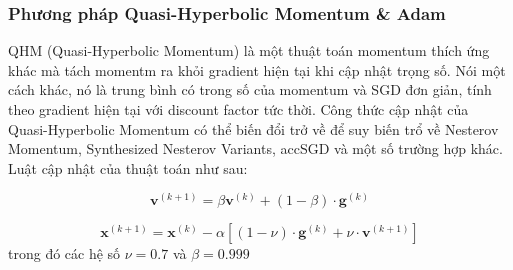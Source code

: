 \subsubsection{Phương pháp Quasi-Hyperbolic Momentum \& Adam}

QHM (Quasi-Hyperbolic Momentum) là một thuật toán momentum thích ứng khác mà tách momentm ra khỏi gradient hiện tại khi cập nhật trọng số. Nói một cách khác, nó là trung bình có trong số của momentum và SGD đơn giản, tính theo gradient hiện tại với discount factor tức thời. Công thức cập nhật của Quasi-Hyperbolic Momentum có thể biến đổi trở về để suy biến trổ về Nesterov Momentum, Synthesized Nesterov Variants, accSGD và một số trường hợp khác. Luật cập nhật của thuật toán như sau:

\begin{equation}
    \mathbf{v}^{(k+1)} = \beta\mathbf{v}^{(k)} + (1-\beta) \cdot \mathbf{g}^{(k)}
\end{equation}

\begin{equation}
    \mathbf{x}^{(k+1)} = \mathbf{x}^{(k)} - \alpha \left[(1-\nu) \cdot \mathbf{g}^{(k)} + \nu \cdot \mathbf{v}^{(k+1)}\right]
\end{equation}
trong đó các hệ số $\nu = 0.7$ và $\beta = 0.999$


